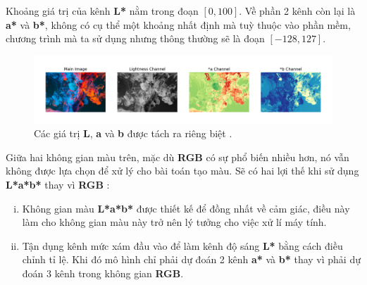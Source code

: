 \documentclass[a4paper, 12pt]{article}
\begin{document}
\noindent
Khoảng giá trị của kênh \textbf{L*} nằm trong đoạn $[0, 100]$. Về phần 2 kênh còn lại là \textbf{a*} và \textbf{b*}, không có cụ thể một khoảng nhất định mà tuỳ thuộc vào phần mềm, chương trình mà ta sử dụng nhưng thông thường sẽ là đoạn $[-128, 127]$.\vspace{5pt}

\begin{figure}[!h]
\captionsetup{width=0.8\textwidth}
\centering
\includegraphics[width=16cm]{images/2_3.jpeg}
\caption{Các giá trị \textbf{L}, \textbf{a} và \textbf{b} được tách ra riêng biệt \cite{moeincolorization2020}.}
\label{fig:inspectlab}
\end{figure}

\noindent
Giữa hai không gian màu trên, mặc dù \textbf{RGB} có sự phổ biến nhiều hơn, nó vẫn không được lựa chọn để xử lý cho bài toán tạo màu. Sẽ có hai lợi thế khi sử dụng \textbf{L*a*b*} thay vì \textbf{RGB} \cite{wikilab2021}:
\begin{enumerate}[i)]
    \item Không gian màu \textbf{L*a*b*} được thiết kế để đồng nhất về cảm giác, điều này làm cho không gian màu này trở nên lý tưởng cho việc xử lí máy tính.
    \item Tận dụng kênh mức xám đầu vào để làm kênh độ sáng \textbf{L*} bằng cách điều chỉnh tỉ lệ. Khi đó mô hình chỉ phải dự đoán 2 kênh \textbf{a*} và \textbf{b*} thay vì phải dự đoán 3 kênh trong không gian \textbf{RGB}.
\end{enumerate}
\end{document}
